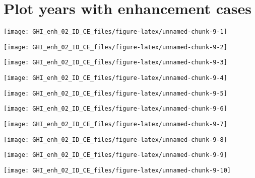 \documentclass[
  10pt,
  a4paper,oneside]{article}
\begin{document}
\hypertarget{plot-years-with-enhancement-cases}{%
\section{Plot years with enhancement cases}\label{plot-years-with-enhancement-cases}}

\begin{center}\texttt{[image: GHI\_enh\_02\_ID\_CE\_files/figure-latex/unnamed-chunk-9-1]} \end{center}

\begin{center}\texttt{[image: GHI\_enh\_02\_ID\_CE\_files/figure-latex/unnamed-chunk-9-2]} \end{center}

\begin{center}\texttt{[image: GHI\_enh\_02\_ID\_CE\_files/figure-latex/unnamed-chunk-9-3]} \end{center}

\begin{center}\texttt{[image: GHI\_enh\_02\_ID\_CE\_files/figure-latex/unnamed-chunk-9-4]} \end{center}

\begin{center}\texttt{[image: GHI\_enh\_02\_ID\_CE\_files/figure-latex/unnamed-chunk-9-5]} \end{center}

\begin{center}\texttt{[image: GHI\_enh\_02\_ID\_CE\_files/figure-latex/unnamed-chunk-9-6]} \end{center}

\begin{center}\texttt{[image: GHI\_enh\_02\_ID\_CE\_files/figure-latex/unnamed-chunk-9-7]} \end{center}

\begin{center}\texttt{[image: GHI\_enh\_02\_ID\_CE\_files/figure-latex/unnamed-chunk-9-8]} \end{center}

\begin{center}\texttt{[image: GHI\_enh\_02\_ID\_CE\_files/figure-latex/unnamed-chunk-9-9]} \end{center}

\begin{center}\texttt{[image: GHI\_enh\_02\_ID\_CE\_files/figure-latex/unnamed-chunk-9-10]} \end{center}
\end{document}
